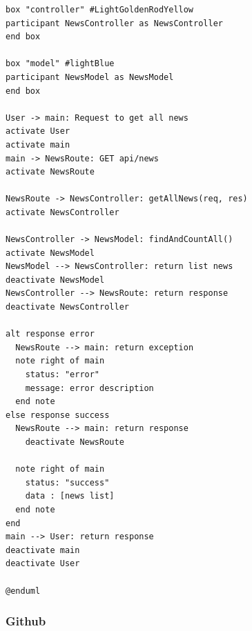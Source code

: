\begin{enumerate}[a)]
\begin{lstlisting}
box "controller" #LightGoldenRodYellow
participant NewsController as NewsController
end box

box "model" #lightBlue
participant NewsModel as NewsModel
end box

User -> main: Request to get all news
activate User
activate main
main -> NewsRoute: GET api/news
activate NewsRoute

NewsRoute -> NewsController: getAllNews(req, res)
activate NewsController

NewsController -> NewsModel: findAndCountAll()
activate NewsModel
NewsModel --> NewsController: return list news
deactivate NewsModel
NewsController --> NewsRoute: return response
deactivate NewsController

alt response error
  NewsRoute --> main: return exception
  note right of main
    status: "error"
    message: error description
  end note
else response success
  NewsRoute --> main: return response
    deactivate NewsRoute

  note right of main
    status: "success"
    data : [news list]
  end note
end
main --> User: return response
deactivate main
deactivate User

@enduml

\end{lstlisting}

\end{enumerate}


\subsubsection*{Github}


